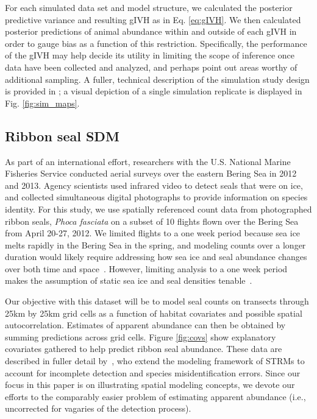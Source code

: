 \documentclass[10pt,letterpaper]{article}
\begin{document}
For each simulated data set and model structure, we calculated the posterior predictive variance and resulting gIVH as in Eq. \ref{eq:gIVH}. We then calculated posterior predictions of animal abundance within and outside of each gIVH in order to gauge bias as a function of this restriction.  Specifically, the performance of the gIVH may help decide its utility in limiting the scope of inference once data have been collected and analyzed, and perhaps point out areas worthy of additional sampling.  A fuller, technical description of the simulation study design is provided in ; a visual depiction of a single simulation replicate is displayed in
Fig. \ref{fig:sim_maps}.


\subsection*{Ribbon seal SDM}

As part of an international effort, researchers with the U.S. National Marine Fisheries Service conducted aerial surveys over the eastern Bering Sea in 2012 and 2013.  Agency scientists used infrared video to detect seals that were on ice, and collected simultaneous digital photographs to provide information on species identity. For this study, we use spatially referenced count data from photographed ribbon seals, {\it Phoca fasciata} on a subset of 10 flights flown over the Bering Sea from April 20-27, 2012.  We limited flights to a one week period because sea ice melts rapidly in the Bering Sea in the spring, and modeling counts over a longer duration would likely require addressing how sea ice and seal abundance changes over both time and space~\cite{ConnEtAl2015}. However, limiting analysis to a one week period makes the assumption of static sea ice and seal densities tenable~\cite{ConnEtAl2014}.

Our objective with this dataset will be to model seal counts on transects through 25km by 25km grid cells as a function of habitat covariates and possible spatial autocorrelation.
Estimates of apparent abundance can then be obtained by summing predictions across grid cells. Figure \ref{fig:covs} show explanatory covariates gathered to help predict ribbon seal abundance.  These data are described in fuller detail by~\cite{ConnEtAl2014}, who extend the modeling framework of STRMs to account for incomplete detection and species misidentification errors.  Since our focus in this paper is on illustrating spatial modeling concepts, we devote our efforts to the comparably easier problem of estimating apparent abundance (i.e., uncorrected for vagaries of the detection process).
\end{document}
